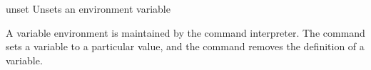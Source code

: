 \begin{nusmvCommand} {unset} {Unsets an environment variable}
 

A variable environment is maintained by the command interpreter.  The
 command sets a variable to a particular value, and the
 command removes the definition of a variable.

\begin{cmdOpt}


\end{cmdOpt}

\end{nusmvCommand}
